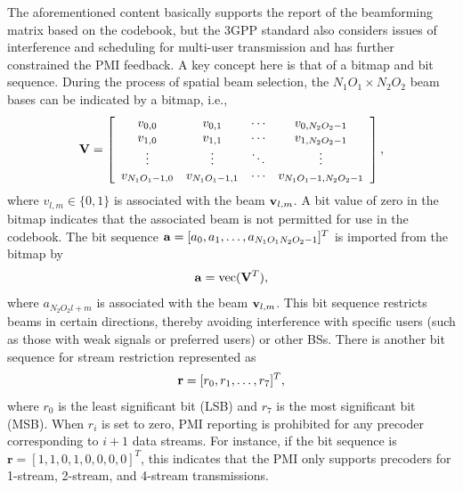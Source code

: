 \documentclass[lettersize,journal]{IEEEtran}
\begin{document}
The aforementioned content basically supports the report of the beamforming matrix based on the codebook, but the 3GPP standard also considers issues of interference and scheduling for multi-user transmission and has further constrained the PMI feedback. A key concept here is that of a bitmap and bit sequence. During the process of spatial beam selection, the $N_1O_1 \times N_2O_2$ beam bases can be indicated by a bitmap, i.e.,
\begin{equation*}
{\bf{V}} = \left[ {\begin{array}{*{20}{c}}
{{v_{0,0}}}&{{v_{0,1}}}& \cdots &{{v_{0,{N_2}{O_2} - 1}}}\\
{{v_{1,0}}}&{{v_{1,1}}}& \cdots &{{v_{1,{N_2}{O_2} - 1}}}\\
 \vdots & \vdots & \ddots & \vdots \\
{{v_{{N_1}{O_1} - 1,0}}}&{{v_{{N_1}{O_1} - 1,1}}}& \cdots &{{v_{{N_1}{O_1} - 1,{N_2}{O_2} - 1}}}
\end{array}} \right],
\end{equation*}
 where $v_{l,m} \in \{0,1\}$ is associated with the beam ${\bf{v}}_{l,m}$. A bit value of zero in the bitmap indicates that the associated beam is not permitted for use in the codebook. The bit sequence ${\bf{a}}=[a_0,a_1,\ldots,a_{N_1O_1N_2O_2-1}]^T$ is imported from the bitmap by
 \begin{equation}\label{type1map}
{\bf{a}} = {\rm{vec}}({\bf{V}}^T),
 \end{equation}
where $a_{N_2O_2l+m}$ is associated with the beam ${\bf{v}}_{l,m}$. This bit sequence restricts beams in certain directions, thereby avoiding interference with specific users (such as those with weak signals or preferred users) or other BSs.
There is another bit sequence for stream restriction represented as 
\begin{equation}
    {\bf{r}}=[r_0,r_1,\ldots,r_7]^T,
\end{equation}
where $r_0$ is the least significant bit (LSB) and $r_7$ is the most significant bit (MSB). When $r_i$ is set to zero, PMI reporting is prohibited for any precoder corresponding to $i+1$ data streams. For instance, if the bit sequence is $\mathbf{r} = [1,1,0,1,0,0,0,0]^T$, this indicates that the PMI only supports precoders for 1-stream, 2-stream, and 4-stream transmissions.
\end{document}
